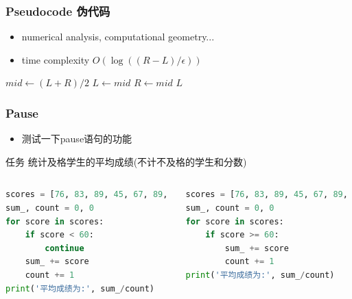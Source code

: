 \begin{frame}[containsverbatim]\frametitle{Pseudocode 伪代码}
	\begin{itemize}
		\item numerical analysis, computational geometry...
		\item time complexity $O(\log{((R-L)/\epsilon)})$
	\end{itemize}

	\begin{algorithm}[H]
		\label{BinarySearch}
		\begin{algorithmic}[1]
			\State $mid \gets (L+R)/2$
			\State $L \gets mid$
			\Else
			\State $R \gets mid$
			\EndIf
			\EndWhile
			\Return $L$
			\EndProcedure
		\end{algorithmic}
	\end{algorithm}
\end{frame}


\begin{frame}[t, fragile]\frametitle{Pause}
	\begin{itemize}
		\item 测试一下{\red pause}语句的功能
	\end{itemize}

	\pause
	\begin{block}{任务}
		统计及格学生的平均成绩(不计不及格的学生和分数)
	\end{block}

	\pause
	\begin{columns}[t]

		\begin{lstlisting}[language=Python]
scores = [76, 83, 89, 45, 67, 89, 85, 77]
sum_, count = 0, 0
for score in scores:
    if score < 60:
        continue
    sum_ += score
    count += 1
print('平均成绩为:', sum_/count)
\end{lstlisting}

		\pause
		\begin{lstlisting}[language=Python]
scores = [76, 83, 89, 45, 67, 89, 85, 77]
sum_, count = 0, 0
for score in scores:
    if score >= 60:
        sum_ += score
        count += 1
print('平均成绩为:', sum_/count)
\end{lstlisting}
	\end{columns}

\end{frame}

